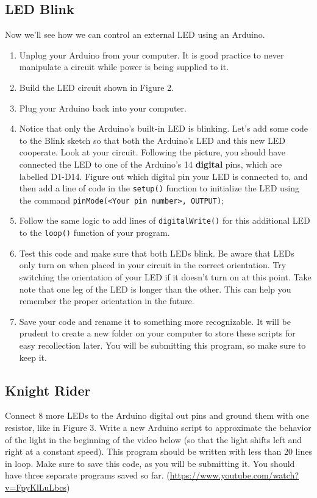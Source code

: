 \documentclass[12pt]{article}
\begin{document}
\subsection*{LED Blink}
Now we'll see how we can control an external LED using an Arduino.
\begin{enumerate}
\item Unplug your Arduino from your computer. It is good practice to
  never manipulate a circuit while power is being supplied to it.
\item Build the LED circuit shown in Figure 2.
        	
\item Plug your Arduino back into your computer. 
        	
\item Notice that only the Arduino’s built-in LED is blinking. Let’s
  add some code to the Blink sketch so that both the Arduino’s LED and
  this new LED cooperate. Look at your circuit. Following the picture,
  you should have connected the LED to one of the Arduino’s 14
  \textbf{digital} pins, which are labelled D1-D14. Figure out which
  digital pin your LED is connected to, and then add a line of code in
  the \verb|setup()| function to initialize the LED using the command
  \verb|pinMode(<Your pin number>, OUTPUT)|;
        	
\item Follow the same logic to add lines of \verb|digitalWrite()| for
  this additional LED to the \verb|loop()| function of your program.
        	
\item Test this code and make sure that both LEDs blink. Be aware that
  LEDs only turn on when placed in your circuit in the correct
  orientation. Try switching the orientation of your LED if it doesn't
  turn on at this point. Take note that one leg of the LED is longer
  than the other. This can help you remember the proper orientation in
  the future.
        	
\item Save your code and rename it to something more recognizable. It
  will be prudent to create a new folder on your computer to store
  these scripts for easy recollection later. You will be submitting
  this program, so make sure to keep it.
        	
\end{enumerate}
        
\subsection*{Knight Rider}
Connect 8 more LEDs to the Arduino digital out pins and ground them
with one resistor, like in Figure 3. Write a new Arduino script to
approximate the behavior of the light in the beginning of the video
below (so that the light shifts left and right at a constant
speed). This program should be written with less than 20 lines in
loop. Make sure to save this code, as you will be submitting it. You
should have three separate programs saved so
far. (\url{https://www.youtube.com/watch?v=FpyKlLuLbcs})
        
\end{document}
